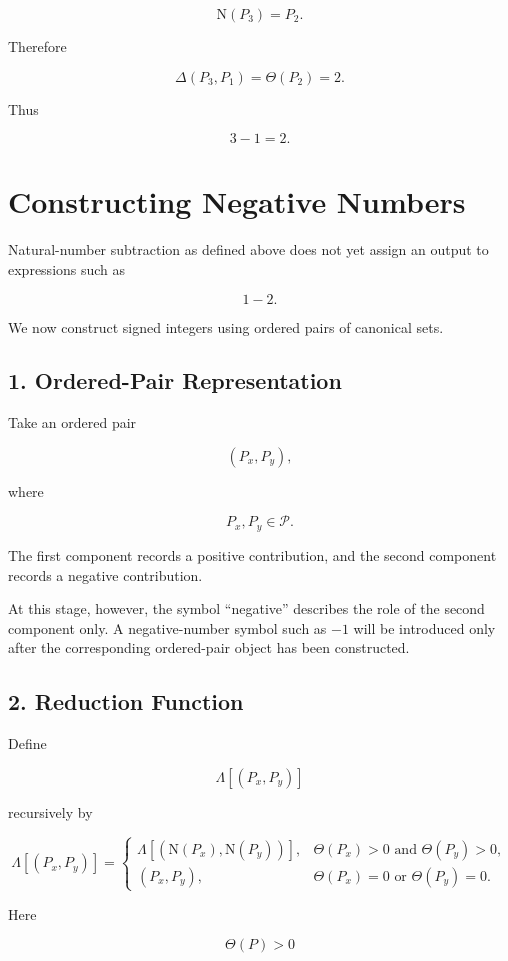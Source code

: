 \documentclass[12pt]{article}
\newcommand{\Nu}{\mathrm{N}}
\begin{document}
\[
\Nu(P_3)=P_2.
\]

Therefore

\[
\Delta(P_3,P_1)
=
\Theta(P_2)
=
2.
\]

Thus

\[
\boxed{
3-1=2.
}
\]

\section*{Constructing Negative Numbers}

Natural-number subtraction as defined above does not yet assign an output to expressions such as

\[
1-2.
\]

We now construct signed integers using ordered pairs of canonical sets.

\subsection*{1. Ordered-Pair Representation}

Take an ordered pair

\[
(P_x,P_y),
\]

where

\[
P_x,P_y\in\mathcal P.
\]

The first component records a positive contribution, and the second component records a negative contribution.

At this stage, however, the symbol ``negative'' describes the role of the second component only. A negative-number symbol such as \(-1\) will be introduced only after the corresponding ordered-pair object has been constructed.

\subsection*{2. Reduction Function}

Define

\[
\Lambda[(P_x,P_y)]
\]

recursively by

\[
\boxed{
\Lambda[(P_x,P_y)]
=
\begin{cases}
\Lambda[(\Nu(P_x),\Nu(P_y))],
&
\Theta(P_x)>0\text{ and }\Theta(P_y)>0,
\\[6pt]
(P_x,P_y),
&
\Theta(P_x)=0\text{ or }\Theta(P_y)=0.
\end{cases}
}
\]

Here

\[
\Theta(P)>0
\]
\end{document}
